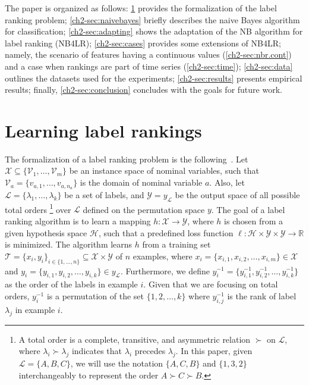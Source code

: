 \documentclass[a4paper,12pt,openright,notitlepage]{report}\usepackage[]{graphicx}\usepackage[]{color}
\begin{document}
The paper is organized as follows: \ref{ch2-sec:learning} provides the formalization of the label ranking problem; \ref{ch2-sec:naivebayes} briefly  describes the naive Bayes algorithm for classification; \ref{ch2-sec:adapting} shows the adaptation of the NB algorithm for label ranking (NB4LR); \ref{ch2-sec:cases} provides some extensions of NB4LR; namely, the scenario of features having a continuous values (\ref{ch2-sec:nbr.cont})  and a case when rankings are part of time series (\ref{ch2-sec:time}); \ref{ch2-sec:data} outlines the datasets used for the experiments;
\ref{ch2-sec:results} presents empirical results; finally, \ref{ch2-sec:conclusion} concludes with the goals for future work.

 \section{Learning label rankings}
 \label{ch2-sec:learning}

The formalization of a label ranking problem is the following~\citep{vembu2009}. Let $\mathcal{X} \subseteq \{\mathcal{V}_1,\ldots,\mathcal{V}_m\}$ be an instance space of nominal variables, such that $\mathcal{V}_a=\{v_{a,1}, \ldots, v_{a,n_a}\}$ is the domain of nominal variable $a$.  Also, let $\mathcal{L} = \{\lambda_1,\ldots,\lambda_k\}$ be a set of labels, and $\mathcal{Y} = y_{\mathcal{L}}$ be the output space of all possible total orders%
\footnote{A total order is a complete, transitive, and asymmetric relation $\succ$ on $\mathcal{L}$, where $\lambda_i \succ \lambda_j$ indicates that $\lambda_i$ precedes $\lambda_j$. In this paper, given $\mathcal{L}=\{A,B,C\}$, we will use the notation $\{A,C,B\}$ and $\{1,3,2\}$ interchangeably to represent the order $A \succ C \succ B$.} over $\mathcal{L}$ defined on the permutation space $y$. The goal of a label ranking algorithm is to learn a mapping $h: \mathcal{X} \rightarrow \mathcal{Y}$, where $h$ is chosen from a given hypothesis space $\mathcal{H}$, such that a predefined loss function $\ell: \mathcal{H} \times \mathcal{Y} \times \mathcal{Y} \rightarrow \mathbb{R}$ is minimized. The algorithm learns $h$ from a training set $\mathcal{T}=\{x_i,y_i\}_{i \in \{1, \ldots, n\}} \subseteq \mathcal{X} \times \mathcal{Y}$ of $n$ examples, where $x_i = \{x_{i,1}, x_{i,2}, \ldots, x_{i,m} \} \in \mathcal{X}$ and $ y_i = \{y_{i,1}, y_{i,2}, \dots, y_{i,k}\} \in y_{\mathcal{L}}$. Furthermore, we define $y_i^{-1} = \{y_{i,1}^{-1}, y_{i,2}^{-1}, \ldots, y_{i,k}^{-1}\}$ as the order of the labels in example $i$. Given that we are focusing on total orders, $y_i^{-1}$ is a permutation of the set $\{1, 2, \ldots, k\}$ where $y_{i,j}^{-1}$ is the rank of label $\lambda_j$ in example $i$.
\end{document}
